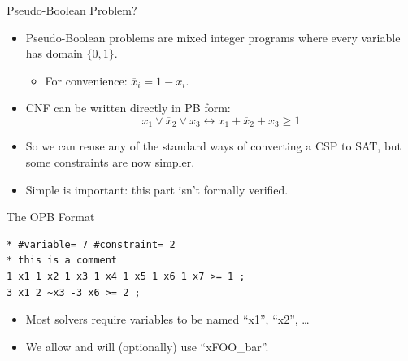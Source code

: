 \documentclass{beamer}
\begin{document}
\begin{frame}{Pseudo-Boolean Problem?}
    \begin{itemize}
        \item Pseudo-Boolean problems are mixed integer programs where every variable has domain $\{
                0, 1 \}$.
            \begin{itemize}
                \item For convenience: $\overline{x}_i = 1 - x_i$.
            \end{itemize}
        \item CNF can be written directly in PB form: \[
                x_1 \vee \overline{x}_2 \vee x_3 \leftrightarrow x_1 + \overline{x}_2 + x_3 \ge 1
            \]
        \item So we can reuse any of the standard ways of converting a CSP to SAT, but some
            constraints are now simpler.
        \item Simple is important: this part isn't formally verified.
    \end{itemize}
\end{frame}

\begin{frame}[fragile]{The OPB Format}
\begin{lstlisting}
* #variable= 7 #constraint= 2
* this is a comment
1 x1 1 x2 1 x3 1 x4 1 x5 1 x6 1 x7 >= 1 ;
3 x1 2 ~x3 -3 x6 >= 2 ;
\end{lstlisting}
    \begin{itemize}
        \item Most solvers require variables to be named ``x1'', ``x2'', \ldots
        \item We allow and will (optionally) use ``xFOO\_bar''.
    \end{itemize}
\end{frame}
\end{document}
